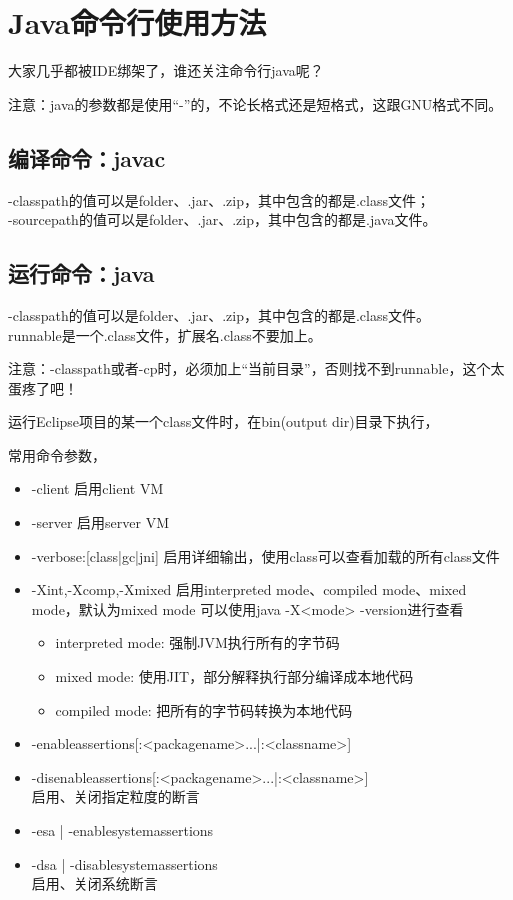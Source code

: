 ﻿\section[Java命令行使用方法]{Java命令行使用方法}
大家几乎都被IDE绑架了，谁还关注命令行java呢？\par
注意：java的参数都是使用“-”的，不论长格式还是短格式，这跟GNU格式不同。

\subsection[编译命令：javac]{编译命令：javac}
-classpath的值可以是folder、.jar、.zip，其中包含的都是.class文件；\\
-sourcepath的值可以是folder、.jar、.zip，其中包含的都是.java文件。

\subsection[运行命令：java]{运行命令：java}
-classpath的值可以是folder、.jar、.zip，其中包含的都是.class文件。\\
runnable是一个.class文件，扩展名.class不要加上。

注意：-classpath或者-cp时，必须加上“当前目录”，否则找不到runnable，这个太蛋疼了吧！

运行Eclipse项目的某一个class文件时，在bin(output dir)目录下执行，

常用命令参数，

\begin{itemize}
  \item -client 启用client VM
  \item -server 启用server VM
  \item -verbose:[class|gc|jni] 启用详细输出，使用class可以查看加载的所有class文件
  \item -Xint,-Xcomp,-Xmixed 启用interpreted mode、compiled mode、mixed mode，默认为mixed mode
  可以使用java -X<mode> -version进行查看
    \begin{itemize}
      \item interpreted mode: 强制JVM执行所有的字节码
      \item mixed mode: 使用JIT，部分解释执行部分编译成本地代码
      \item compiled mode: 把所有的字节码转换为本地代码
    \end{itemize}
  \item -enableassertions[:<packagename>...|:<classname>]
  \item -disenableassertions[:<packagename>...|:<classname>]\\
  启用、关闭指定粒度的断言
  \item  -esa | -enablesystemassertions
  \item -dsa | -disablesystemassertions\\
  启用、关闭系统断言
\end{itemize}

